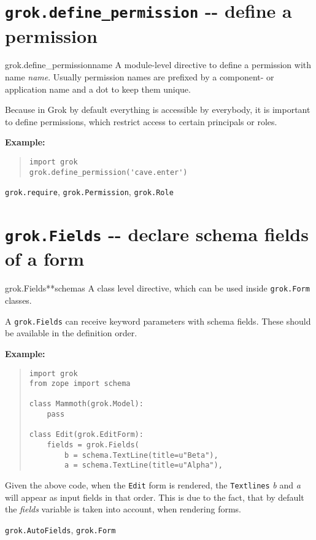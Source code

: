 \documentclass[10pt,a4paper,english]{manual}
\newcommand{\titlereference}[1]{\textsl{#1}}
\begin{document}
\section{\texttt{grok.define{\_}permission} -{}- define a permission}
\begin{funcdesc}{grok.define{\_}permission}{name}
A module-level directive to define a permission with name
\titlereference{name}. Usually permission names are prefixed by a component- or
application name and a dot to keep them unique.

Because in Grok by default everything is accessible by everybody,
it is important to define permissions, which restrict access to
certain principals or roles.

\textbf{Example:}
\begin{quote}\begin{verbatim}
import grok
grok.define_permission('cave.enter')
\end{verbatim}\end{quote}
\begin{seealso}

\texttt{grok.require}, \texttt{grok.Permission}, \texttt{grok.Role}
\end{seealso}

\end{funcdesc}



\section{\texttt{grok.Fields} -{}- declare schema fields of a form}
\begin{funcdesc}{grok.Fields}{**schemas}
A class level directive, which can be used inside \texttt{grok.Form}
classes.

A \texttt{grok.Fields} can receive keyword parameters with schema
fields. These should be available in the definition order.

\textbf{Example:}
\begin{quote}\begin{verbatim}
import grok
from zope import schema

class Mammoth(grok.Model):
    pass

class Edit(grok.EditForm):
    fields = grok.Fields(
        b = schema.TextLine(title=u"Beta"),
        a = schema.TextLine(title=u"Alpha"),
\end{verbatim}\end{quote}

Given the above code, when the \texttt{Edit} form is rendered, the
\texttt{Textlines} \titlereference{b} and \titlereference{a} will appear as input fields in that
order. This is due to the fact, that by default the \titlereference{fields}
variable is taken into account, when rendering forms.
\begin{seealso}

\texttt{grok.AutoFields}, \texttt{grok.Form}
\end{seealso}

\end{funcdesc}
\end{document}
